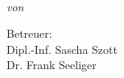 \begin{titlepage}
    \vspace*{5cm}
    \makeatletter
    \begin{center}
      \begin{Large}
        \@title
      \end{Large}\\[0.1cm]
      \emph{von}\\
      \@author
    \end{center}
    \vspace{7.5 cm}
     Betreuer:\\ 
      \hspace*{1.5cm} Dipl.-Inf. Sascha Szott\\
      \hspace*{1.5cm} Dr. Frank Seeliger
    \makeatother
  \end{titlepage}
  
  \newpage
  \null
  \thispagestyle{empty}
  \newpage